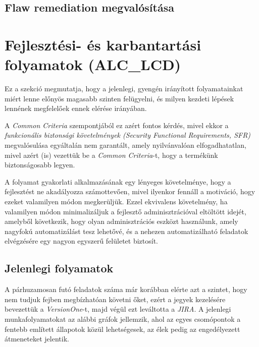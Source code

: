 \subsection{Flaw remediation megvalósítása}


\section{Fejlesztési- és karbantartási folyamatok (ALC\_LCD)}
Ez a szekció megmutatja, hogy a jelenlegi, gyengén irányított folyamatainkat miért lenne előnyös
magasabb szinten felügyelni, és milyen kezdeti lépések lennének megfelelőek ennek elérése irányában.

A \emph{Common Criteria} szempontjából ez azért fontos kérdés, mivel ekkor a
\emph{funkcionális biztonsági követelmények (Security Functional Requirements, SFR)} megvalósulása
egyáltalán nem garantált, amely nyilvánvalóan elfogadhatatlan, mivel azért (is) vezettük be a
\emph{Common Criteria}-t, hogy a termékünk biztonságosabb legyen.

A folyamat gyakorlati alkalmazásának egy lényeges követelménye, hogy a fejlesztést ne akadályozza
számottevően, mivel ilyenkor fennáll a motiváció, hogy ezeket valamilyen módon megkerüljük. Ezzel
ekvivalens követelmény, ha valamilyen módon minimalizáljuk a fejlesztő adminisztrációval eltöltött
idejét, amelyből következik, hogy olyan adminisztrációs eszközt használunk, amely nagyfokú
automatizálást tesz lehetővé, és a nehezen automatizálható feladatok elvégzésére egy nagyon egyszerű
felületet biztosít.

\subsection{Jelenlegi folyamatok}
A párhuzamosan futó feladatok száma már korábban elérte azt a szintet, hogy nem tudjuk fejben
megbízhatóan követni őket, ezért a jegyek kezelésére bevezettük a \emph{VersionOne}-t, majd végül
ezt leváltotta a \emph{JIRA}.  A jelenlegi munkafolyamatokat az alábbi gráfok jellemzik, ahol az
egyes csomópontok a fentebb említett állapotok közül lehetségesek, az élek pedig az engedélyezett
átmeneteket jelentik.

